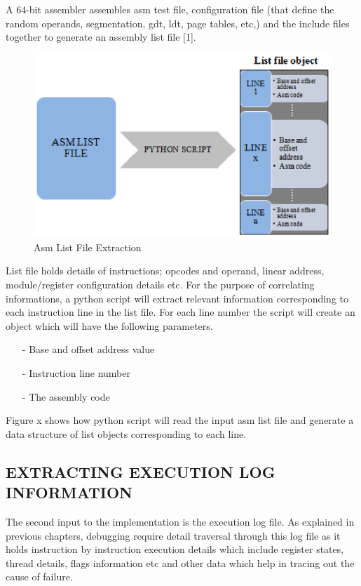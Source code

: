 A 64-bit assembler assembles asm test file, configuration file (that define the random operands, segmentation, gdt, ldt, page tables, etc,) and the include files together to generate an assembly list file [1].
\begin{figure}[H]
\centering
\includegraphics[width=4.5in]{./figures/list.eps}
\caption{Asm List File Extraction}
\end{figure}
List file holds details of instructions; opcodes and operand, linear address, module/register configuration details etc. For the purpose of correlating informations, a python script will extract relevant information corresponding to each instruction line in the list file.  For each line number the script will create an object which will have the following parameters.
\begin{itemize}
	\item[-] Base and offset address value
	\item[-] Instruction line number
	\item[-] The assembly code
\end{itemize}

Figure x shows how python script will read the input asm list file and generate a data structure of list objects corresponding to each line. 

\subsection {EXTRACTING EXECUTION LOG INFORMATION}
The second input to the implementation is the execution log file. As explained in previous chapters, debugging require detail traversal through this log file as it holds instruction by instruction execution details which include register states, thread details, flags information etc and other data which help in tracing out the cause of failure. 

